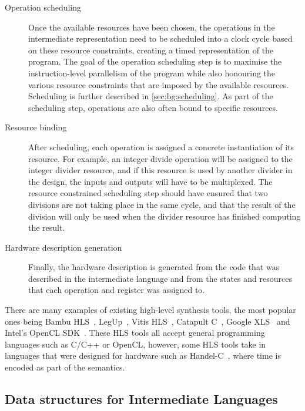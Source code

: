 \begin{description}
\item[Operation scheduling] Once the available resources have been chosen, the
  operations in the intermediate representation need to be scheduled into a
  clock cycle based on these resource constraints, creating a timed
  representation of the program.  The goal of the operation scheduling step is
  to maximise the instruction-level parallelism of the program while also
  honouring the various resource constraints that are imposed by the available
  resources.  Scheduling is further described in \cref{sec:bg:scheduling}.  As
  part of the scheduling step, operations are also often bound to specific
  resources.

\item[Resource binding] After scheduling, each operation is assigned a concrete
  instantiation of its resource.  For example, an integer divide operation will
  be assigned to the integer divider resource, and if this resource is used by
  another divider in the design, the inputs and outputs will have to be
  multiplexed.  The resource constrained scheduling step should have ensured
  that two divisions are not taking place in the same cycle, and that the result
  of the division will only be used when the divider resource has finished
  computing the result.

\item[Hardware description generation] Finally, the hardware description is
  generated from the code that was described in the intermediate language and
  from the states and resources that each operation and register was assigned
  to.
\end{description}

There are many examples of existing high-level synthesis tools, the most popular
ones being Bambu HLS~\cite{bambu_hls}, LegUp~\cite{canis13_legup}, Vitis
HLS~\cite{amd23_vitis_high_synth}, Catapult
C~\cite{mentor20_catap_high_level_synth}, Google XLS~\cite{google23_xls} and
Intel's OpenCL SDK~\cite{intel20_sdk_openc_applic}.  These HLS tools all accept
general programming languages such as C/C++ or OpenCL, however, some HLS tools
take in languages that were designed for hardware such as
Handel-C~\cite{aubury96_handel_c_languag_refer_guide}, where time is encoded as
part of the semantics.

\subsection{Data structures for Intermediate Languages}%
\label{sec:bg:data-structures-for-intermediate-languages}

